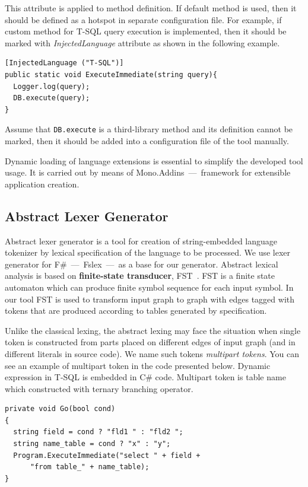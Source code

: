 \documentclass{acm_proc_article-sp}
\begin{document}
This attribute is applied to method definition. If default method is used, then it should be defined as a hotspot in separate configuration file. For example, if custom method for T-SQL query execution is implemented, then it should be marked with {\it InjectedLanguage} attribute as shown in the following example.

\begin{verbatim}
[InjectedLanguage ("T-SQL")]
public static void ExecuteImmediate(string query){
  Logger.log(query);
  DB.execute(query);
}
\end{verbatim}

Assume that \verb|DB.execute| is a third-library method and its definition cannot be marked, then it should be added into a configuration file of the tool manually.

Dynamic loading of language extensions is essential to simplify the developed tool usage. It is carried out by means of Mono.Addins~---~framework for extensible application creation.

\subsection{Abstract Lexer Generator}

Abstract lexer generator is a tool for creation of string-embedded language tokenizer by lexical specification of the language to be processed. We use lexer generator for F\#~---~Fslex~---~as a base for our generator. Abstract lexical analysis is based on {\bf finite-state transducer}, FST~\cite{FST}. FST is a finite state automaton which can produce finite symbol sequence for each input symbol. In our tool FST is used to transform input graph to graph with edges tagged with tokens that are produced according to tables generated by specification.

Unlike the classical lexing, the abstract lexing may face the situation when single token is constructed from parts placed on different edges of input graph (and in different literals in source code). We name such tokens {\it multipart tokens}. You can see an example of multipart token in the code presented below. Dynamic expression in T-SQL is embedded in C\# code. Multipart token is table name which constructed with ternary branching operator.


\begin{verbatim}
private void Go(bool cond)
{
  string field = cond ? "fld1 " : "fld2 ";
  string name_table = cond ? "x" : "y";
  Program.ExecuteImmediate("select " + field +
      "from table_" + name_table);
}
\end{verbatim}
\end{document}
